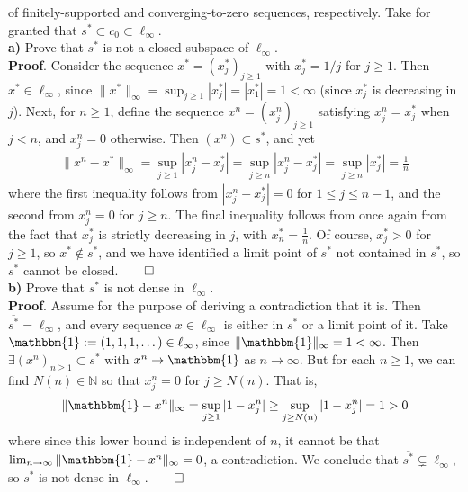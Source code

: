 \documentclass[10pt]{article}
\newcommand{\mbb}[1]{\mathbb{#1}}
\newcommand{\1}[1]{\mathbbm{1}_{#1}}
\begin{document}
    of finitely-supported and converging-to-zero sequences,
    respectively. Take for granted that $s^\ast\subset c_0\subset\ell_\infty$.\\[5pt]
    {\bf a)} Prove that $s^\ast$ is not a closed subspace of $\ell_\infty$.\\[5pt]
    {\bf Proof}. Consider the sequence $x^\ast=(x^\ast_j)_{j\geq 1}$ with $x^\ast_j=1/j$ for $j\geq 1$. Then $x^\ast\in\ell_\infty$, since $\|x^\ast\|_\infty=\sup_{j\geq 1}|x^\ast_j|=|x^\ast_1|=1<\infty$ (since $x^\ast_j$ is decreasing in $j$).
    Next, for $n\geq 1$, define the sequence $x^n=(x^n_j)_{j\geq 1}$ satisfying $x^n_j=x^\ast_j$ when $j<n$, and $x^n_j=0$ otherwise. Then $(x^n)\subset s^\ast$, and yet
    \begin{align*}
        \|x^n-x^\ast\|_\infty=\sup_{j\geq 1}|x^n_j-x^\ast_j|=\sup_{j\geq n}|x^n_j-x^\ast_j|=\sup_{j\geq n}|x^\ast_j|=\frac{1}{n}
    \end{align*}
    where the first inequality follows from $|x^n_j-x^\ast_j|=0$ for $1\leq j\leq n-1$, and the second from $x^n_j=0$ for $j\geq n$. The final inequality follows from
    once again from the fact that $x^\ast_j$ is strictly decreasing in $j$, with $x^\ast_n=\tfrac{1}{n}$. Of course, $x^\ast_j>0$ for $j\geq 1$, so $x^\ast\notin s^\ast$, and we have identified a
    limit point of $s^\ast$ not contained in $s^\ast$, so $s^\ast$ cannot be closed.\hfill{$\qed$}\\[5pt]
    {\bf b)} Prove that $s^\ast$ is not dense in $\ell_\infty$.\\[5pt]
    {\bf Proof}. Assume for the purpose of deriving a contradiction that it is. Then $\overline{s^\ast}=\ell_\infty$, and every sequence $x\in\ell_\infty$ is either in $s^\ast$ or a limit point of it.
    Take $\mathbbm{1}:=(1,1,1,\dots)\in\ell_\infty$, since $\|\mathbbm{1}\|_\infty=1<\infty$. Then $\exists(x^n)_{n\geq 1}\subset s^\ast$ with $x^n\rightarrow\mathbbm{1}$ as $n\rightarrow\infty$. But for each $n\geq 1$,
    we can find $N(n)\in\mbb{N}$ so that $x^n_j=0$ for $j\geq N(n)$. That is,
    \begin{align*}
        \|\mathbbm{1}-x^n\|_\infty=\sup_{j\geq 1}|1-x^n_j|\geq \sup_{j\geq N(n)}|1-x^n_j|=1>0
    \end{align*}
    where since this lower bound is independent of $n$, it cannot be that $\lim_{n\rightarrow\infty}\|\mathbbm{1}-x^n\|_\infty=0$, a contradiction. We conclude that $\overline{s^\ast}\subsetneq\ell_\infty$, so $s^\ast$ is not dense in $\ell_\infty$.\hfill{$\qed$}\\[5pt]
\end{document}
